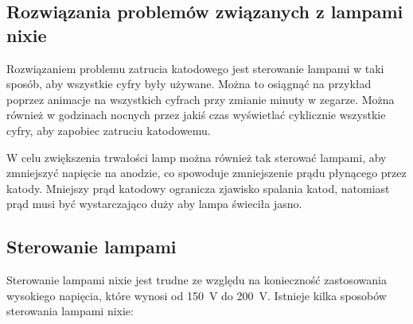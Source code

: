 \documentclass[../main.tex]{subfiles}
\begin{document}
\subsection{Rozwiązania problemów związanych z lampami nixie}
Rozwiązaniem problemu zatrucia katodowego jest sterowanie lampami w taki sposób, aby wszystkie cyfry były używane.
Można to osiągnąć na przykład poprzez animacje na wszystkich cyfrach przy zmianie minuty w zegarze.
Można również w godzinach nocnych przez jakiś czas wyświetlać cyklicznie wszystkie cyfry, aby zapobiec zatruciu katodowemu.

W celu zwiększenia trwałości lamp można również tak sterować lampami, aby zmniejszyć napięcie na anodzie, co spowoduje zmniejszenie prądu płynącego przez katody.
Mniejszy prąd katodowy ogranicza zjawisko spalania katod, natomiast prąd musi być wystarczająco duży aby lampa świeciła jasno.

\newpage

\subsection{Sterowanie lampami}
\label{sec:sterownie_lampi}

Sterowanie lampami nixie jest trudne ze względu na konieczność zastosowania wysokiego napięcia, które wynosi od \SI{150}{\volt} do \SI{200}{\volt}.
Istnieje kilka sposobów sterowania lampami nixie\cite{st:nixie1}:
\end{document}
